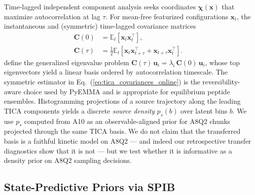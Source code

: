 \documentclass[journal=jctcce,manuscript=article,layout=twocolumn]{achemso}
\begin{document}
Time-lagged independent component analysis seeks coordinates $\boldsymbol\chi(\mathbf{x})$ that maximize autocorrelation at lag $\tau$.\cite{perezhernandez2013tica,schwantes2013improvements} For mean-free featurized configurations $\mathbf{x}_t$, the instantaneous and (symmetric) time-lagged covariance matrices
\begin{equation}
\begin{split}
    \mathbf{C}(0) &= \mathbb{E}_t\!\left[\mathbf{x}_t \mathbf{x}_t^{\top}\right],\\
    \mathbf{C}(\tau) &= \tfrac{1}{2}\mathbb{E}_t\!\left[\mathbf{x}_t \mathbf{x}_{t+\tau}^{\top} + \mathbf{x}_{t+\tau} \mathbf{x}_t^{\top}\right].
\end{split}
    \label{eq:tica_covariances_online}
\end{equation}
define the generalized eigenvalue problem $\mathbf{C}(\tau)\,\mathbf{u}_i = \lambda_i\,\mathbf{C}(0)\,\mathbf{u}_i$, whose top eigenvectors yield a linear basis ordered by autocorrelation timescale. The symmetric estimator in Eq.~(\ref{eq:tica_covariances_online}) is the reversibility-aware choice used by PyEMMA\cite{scherer2015pyemma} and is appropriate for equilibrium peptide ensembles. Histogramming projections of a source trajectory along the leading TICA components yields a discrete \emph{source density} $p_s(b)$ over latent bins $b$. We use $p_s$ computed from A10 as an observable-aligned prior for A8Q2 chunks projected through the same TICA basis. We do not claim that the transferred basis is a faithful kinetic model on A8Q2 --- and indeed our retrospective transfer diagnostics show that it is not --- but we test whether it is informative as a density prior on A8Q2 sampling decisions.

\subsection{State-Predictive Priors via SPIB}
\end{document}
